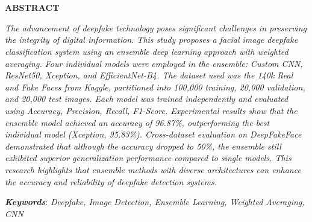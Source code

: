 \chapter*{\MakeUppercase{ \JudulInggris}}
\singlespacing
\begin{center}
    
    \vspace{-4em}
    
    \penulis
    
	\bigskip
    
    \textbf{ABSTRACT}
    
\end{center}


\vspace*{0.2cm}
{
	\setlength{\parindent}{0pt}

	\bigskip
	\bigskip

        \noindent
        \textit{The advancement of \textit{deepfake} technology poses significant challenges in preserving the integrity of digital information. This study proposes a facial image \textit{deepfake} classification system using an \textit{ensemble deep learning} approach with \textit{weighted averaging}. Four individual models were employed in the ensemble: Custom CNN, ResNet50, Xception, and EfficientNet-B4. The dataset used was the \textit{140k Real and Fake Faces} from Kaggle, partitioned into 100,000 training, 20,000 validation, and 20,000 test images. Each model was trained independently and evaluated using Accuracy, Precision, Recall, F1-Score. Experimental results show that the ensemble model achieved an accuracy of 96.87\%, outperforming the best individual model (Xception, 95.83\%). Cross-dataset evaluation on \textit{DeepFakeFace} demonstrated that although the accuracy dropped to 50\%, the ensemble still exhibited superior generalization performance compared to single models. This research highlights that ensemble methods with diverse architectures can enhance the accuracy and reliability of deepfake detection systems.}

	\bigskip

	\textit{\textbf{Keywords}}: 	\textit{Deepfake, Image Detection, Ensemble Learning, Weighted Averaging, CNN}
}

\onehalfspacing